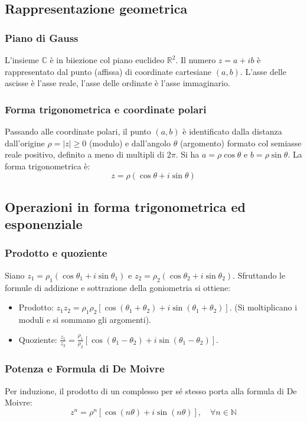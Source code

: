 \subsection{Rappresentazione geometrica}
\subsubsection{Piano di Gauss}
L'insieme $\mathbb{C}$ è in biiezione col piano euclideo $\mathbb{R}^2$. Il numero $z = a+ib$ è rappresentato dal punto (affissa) di coordinate cartesiane $(a,b)$. L'asse delle ascisse è l'asse reale, l'asse delle ordinate è l'asse immaginario.

\subsubsection{Forma trigonometrica e coordinate polari}
Passando alle coordinate polari, il punto $(a,b)$ è identificato dalla distanza dall'origine $\rho = |z| \ge 0$ (modulo) e dall'angolo $\theta$ (argomento) formato col semiasse reale positivo, definito a meno di multipli di $2\pi$.
Si ha $a = \rho \cos \theta$ e $b = \rho \sin \theta$. La forma trigonometrica è:
\[ z = \rho(\cos \theta + i \sin \theta) \]

\subsection{Operazioni in forma trigonometrica ed esponenziale}
\subsubsection{Prodotto e quoziente}
Siano $z_1 = \rho_1(\cos\theta_1 + i\sin\theta_1)$ e $z_2 = \rho_2(\cos\theta_2 + i\sin\theta_2)$. Sfruttando le formule di addizione e sottrazione della goniometria si ottiene:
\begin{itemize}
    \item Prodotto: $z_1 z_2 = \rho_1 \rho_2 [\cos(\theta_1+\theta_2) + i\sin(\theta_1+\theta_2)]$. (Si moltiplicano i moduli e si sommano gli argomenti).
    \item Quoziente: $\frac{z_1}{z_2} = \frac{\rho_1}{\rho_2} [\cos(\theta_1-\theta_2) + i\sin(\theta_1-\theta_2)]$.
\end{itemize}

\subsubsection{Potenza e Formula di De Moivre}
Per induzione, il prodotto di un complesso per sé stesso porta alla formula di De Moivre:
\[ z^n = \rho^n [\cos(n\theta) + i\sin(n\theta)], \quad \forall n \in \mathbb{N} \]

